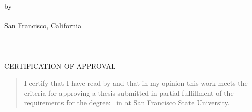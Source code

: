 \documentclass[12pt,oneside]{sfsuthesis}
\theoremstyle{plain} %
\theoremstyle{definition}  %
\theoremstyle{remark}  %
\theoremstyle{plain}
\begin{document}
\thispagestyle{empty}

\[ \]
\vspace{-1.9in}

\begin{center}
{\mytitle}

\vspace{1.4in}


\vspace{.5in}


\vspace{3.1in}

{by \\[12pt] 
\myname \\[12pt]
San Francisco, California\\[12pt]
\thismonth
\thisyear}
\end{center}

\newpage
\textheight=7.1in    %
\footskip=1.1in      %
\thispagestyle{empty}

$\mbox{}$
\vspace{3in}
\begin{center}
\end{center}

\newpage
\thispagestyle{empty}
\[ \]
\vspace{-1.8in}
\begin{center}
{CERTIFICATION OF APPROVAL}
\end{center}
\vspace{.6in}
\begin{quote}
I certify that I have read {\it \mytitle} by \myname and that in my opinion this work meets the criteria for approving a thesis submitted in partial fulfillment of the requirements
for the degree: \mydegree \, in \myfield at San Francisco State University.
\end{quote}
\end{document}
